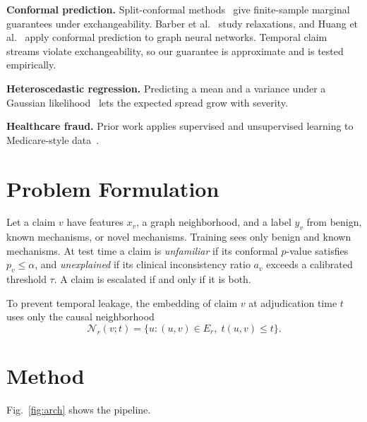 \documentclass[conference]{IEEEtran}
\begin{document}
\textbf{Conformal prediction.} Split-conformal methods~\cite{vovk2005,lei2018,angelopoulos2023} give finite-sample marginal guarantees under exchangeability. Barber et al.~\cite{barber2023} study relaxations, and Huang et al.~\cite{huang2023cfgnn} apply conformal prediction to graph neural networks. Temporal claim streams violate exchangeability, so our guarantee is approximate and is tested empirically.

\textbf{Heteroscedastic regression.} Predicting a mean and a variance under a Gaussian likelihood~\cite{nix1994,kendall2017} lets the expected spread grow with severity.

\textbf{Healthcare fraud.} Prior work applies supervised and unsupervised learning to Medicare-style data~\cite{bauder2017}.

\section{Problem Formulation}
Let a claim $v$ have features $x_v$, a graph neighborhood, and a label $y_v$ from benign, known mechanisms, or novel mechanisms. Training sees only benign and known mechanisms. At test time a claim is \emph{unfamiliar} if its conformal $p$-value satisfies $p_v \le \alpha$, and \emph{unexplained} if its clinical inconsistency ratio $a_v$ exceeds a calibrated threshold $\tau$. A claim is escalated if and only if it is both.

To prevent temporal leakage, the embedding of claim $v$ at adjudication time $t$ uses only the causal neighborhood
\begin{equation}
\mathcal{N}_r(v;t)=\{u:(u,v)\in E_r,\; t(u,v)\le t\}.
\end{equation}

\section{Method}
Fig.~\ref{fig:arch} shows the pipeline.
\end{document}
